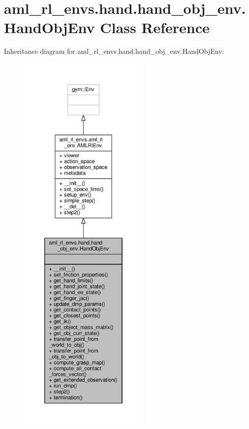 \hypertarget{classaml__rl__envs_1_1hand_1_1hand__obj__env_1_1_hand_obj_env}{\section{aml\-\_\-rl\-\_\-envs.\-hand.\-hand\-\_\-obj\-\_\-env.\-Hand\-Obj\-Env Class Reference}
\label{classaml__rl__envs_1_1hand_1_1hand__obj__env_1_1_hand_obj_env}
}


Inheritance diagram for aml\-\_\-rl\-\_\-envs.\-hand.\-hand\-\_\-obj\-\_\-env.\-Hand\-Obj\-Env\-:
\nopagebreak
\begin{figure}[H]
\begin{center}
\leavevmode
\includegraphics[height=550pt]{classaml__rl__envs_1_1hand_1_1hand__obj__env_1_1_hand_obj_env__inherit__graph}
\end{center}
\end{figure}


